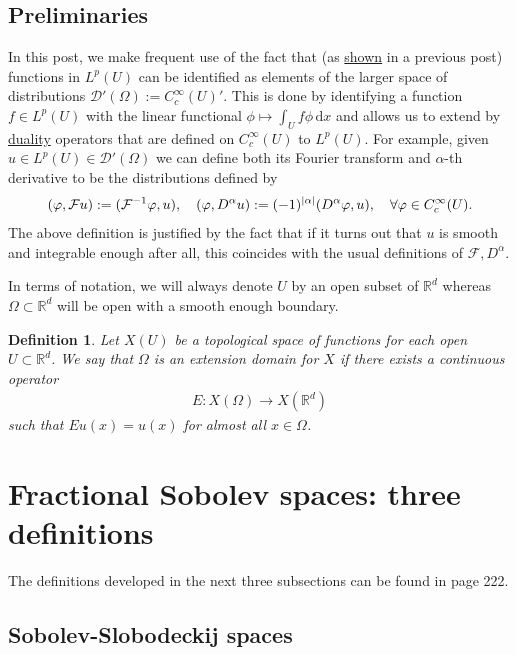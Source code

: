 \documentclass[
    a4paper,
    DIV=14,
    abstract=true,
    numbers=noenddot
]
{scrartcl}
\newtheorem{definition}[theorem]{Definition}
\theoremstyle{definition}
\renewcommand{\d}{\,\mathrm{d}}\newcommand{\dx}{\,\mathrm{d}x}
\newcommand{\R}{\mathbb{R}}
\newcommand{\Dd}{\mathcal{D}}
\newcommand{\Ff}{\mathcal{F}}
\begin{document}
\subsection{Preliminaries}
In this post, we make frequent use of the fact that (as \href{https://nowheredifferentiable.com/2023-07-12-PDEs-3-Sobolev_spaces/#:~:text=we%20would%20like%20to%20see%20what%20some%20of%20them%20look%20like.}{shown} in a previous post) functions in $L^p(U)$ can be identified as elements of the larger space of distributions $\Dd '(\Omega ):= C_c^\infty(U)'$. This is done by identifying a function $f \in L^p(U)$ with the linear functional $\phi \mapsto \int_U f\phi \d x$ and allows us to extend by \href{https://nowheredifferentiable.com/2023-01-29-PDE-1-Fourier/#:~:text=is%20called%20the-,duality,-method%20and%20appears}{duality} operators that are defined on $C_c^\infty(U)$ to $L^p(U)$. For example, given $u \in L^p(U) \in \Dd'(\Omega )$ we can define both its Fourier transform and  $\alpha$-th derivative to be the distributions defined by
\begin{align*}
  (\varphi ,\Ff u):=(\Ff^{-1}\varphi ,u),\quad (\varphi ,D^\alpha u):=(-1)^{\abs{\alpha}}(D^\alpha \varphi ,u), \quad \forall \varphi \in C_c^\infty(U).
\end{align*}
The above definition is justified by the fact that if it turns out that $u$ is smooth and integrable enough after all, this coincides with the usual definitions of $\Ff, D^\alpha$.

In terms of notation, we will always denote $U$ by an open subset of $\R^d$  whereas $\Omega \subset \R^d $ will be open with a smooth enough boundary.
\begin{definition}
  Let $X(U)$ be a topological space of functions for each open $U \subset \R^d$.
  We say that $\Omega $ is an extension domain for $X$ if there exists a continuous operator
  \begin{align*}
    E: X(\Omega ) \to X(\R^d)
  \end{align*}
  such that  $Eu(x)=u(x)$  for almost all $x \in \Omega $.
\end{definition}



\section{Fractional Sobolev spaces: three definitions}
The definitions developed in the next three subsections can be found in \cite{agranovich2015sobolev} page 222.
\subsection{Sobolev-Slobodeckij spaces}
\end{document}
